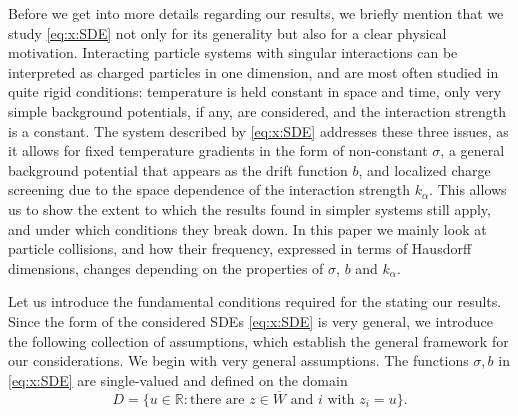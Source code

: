 \documentclass{article}
\numberwithin{equation}{section}
\theoremstyle{plain}
\begin{document}
Before we get into more details regarding our results, we briefly mention that we study \eqref{eq:x:SDE} not only for its generality but also for a clear physical motivation. Interacting particle systems with singular interactions can be interpreted as charged particles in one dimension, and are most often studied in quite rigid conditions: temperature is held constant in space and time, only very simple background potentials, if any, are considered, and the interaction strength is a constant. The system described by \eqref{eq:x:SDE} addresses these three issues, as it allows for fixed temperature gradients in the form of non-constant $\sigma$, a general background potential that appears as the drift function $b$, and localized charge screening due to the space dependence of the interaction strength $k_\alpha$. This allows us to show the extent to which the results found in simpler systems still apply, and under which conditions they break down. In this paper we mainly look at particle collisions, and how their frequency, expressed in terms of Hausdorff dimensions, changes depending on the properties of $\sigma$, $b$ and $k_\alpha$.

Let us introduce the fundamental conditions required for the stating our results. Since the form of the considered SDEs \eqref{eq:x:SDE} is very general, we introduce the following collection of assumptions, which establish the general framework for our considerations. We begin with very general assumptions. The functions $\sigma,b$ in \eqref{eq:x:SDE} are single-valued and defined on the domain 
    \begin{equation*}
        D=\{u\in\mathbb R:\text{there are }z\in\overline W \text{ and }i\text{ with }z_i=u\}.
    \end{equation*}
    
\end{document}
